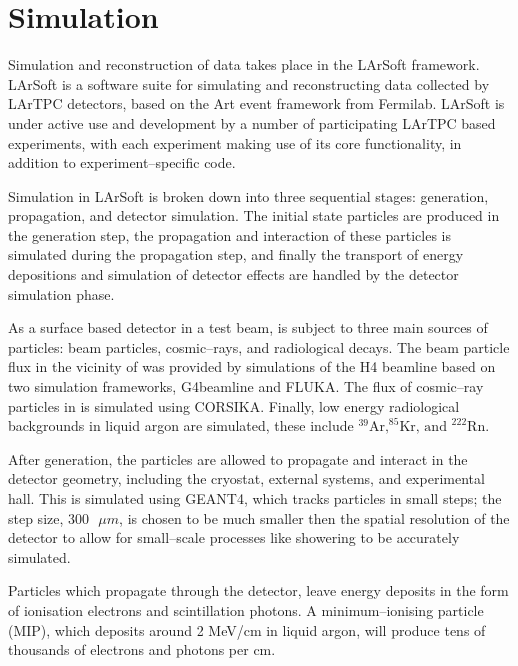 \section{Simulation} \label{sec:simulation}

Simulation and reconstruction of \protodune{} data takes place in the LArSoft
framework\cite{Snider2017}. LArSoft is a software suite for simulating and
reconstructing data collected by LArTPC detectors, based on the Art event 
framework from Fermilab\cite{Green:2012gv}. LArSoft is under active use and
development by a number of participating LArTPC based experiments, with each
experiment making use of its core functionality, in addition to 
experiment--specific code. 

Simulation in LArSoft is broken down into three sequential stages: generation,
propagation, and detector simulation. The initial state particles are produced
in the generation step, the propagation and interaction of these particles is 
simulated during the propagation step, and finally the transport of energy 
depositions and simulation of detector effects are handled by the detector 
simulation phase.

As a surface based detector in a test beam, \protodune{} is subject to three
main sources of particles: beam particles, cosmic--rays, and radiological 
decays. The beam particle flux in the vicinity of \protodune{} was provided by 
simulations of the H4 beamline\cite{Booth:2019brj} based on two simulation 
frameworks, G4beamline\cite{g4beamline} and FLUKA\cite{BOHLEN2014211}. The flux
of cosmic--ray particles in \protodune{} is simulated using 
CORSIKA\cite{Heck:1998vt}. Finally, low energy radiological backgrounds in 
liquid argon are simulated, these include $^{39}\mbox{Ar,} ^ {85}\mbox{Kr, and }
^{222}\mbox{Rn}$.

After generation, the particles are allowed to propagate and interact in the 
detector geometry, including the cryostat, external systems, and experimental
hall. This is simulated using GEANT4\cite{Agostinelli:2002hh}, which tracks 
particles in small steps; the step size, $300 \mbox{ } \mu m$, is chosen to be 
much smaller then the spatial resolution of the detector to allow for 
small--scale processes like showering to be accurately simulated. 

Particles which propagate through the detector, leave energy deposits in the 
form of ionisation electrons and scintillation photons. A minimum--ionising 
particle (MIP), which deposits around 2 MeV/cm in liquid argon, will produce 
tens of thousands of electrons and photons per cm.

